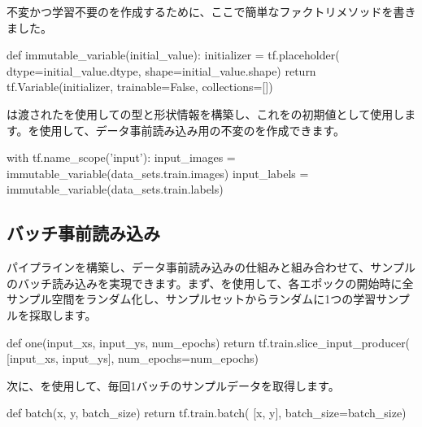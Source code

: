 \begin{content}
不変かつ学習不要のを作成するために、ここで簡単なファクトリメソッドを書きました。


\begin{leftbar}
\begin{python}
def immutable_variable(initial_value):
  initializer = tf.placeholder(
    dtype=initial_value.dtype,
    shape=initial_value.shape)
  return tf.Variable(initializer, trainable=False, collections=[])
\end{python}
\end{leftbar}

は渡されたを使用しての型と形状情報を構築し、これをの初期値として使用します。を使用して、データ事前読み込み用の不変のを作成できます。


\begin{leftbar}
\begin{python}
with tf.name_scope('input'):
  input_images = immutable_variable(data_sets.train.images)
  input_labels = immutable_variable(data_sets.train.labels)
\end{python}
\end{leftbar}

\subsection{バッチ事前読み込み}

パイプラインを構築し、データ事前読み込みの仕組みと組み合わせて、サンプルのバッチ読み込みを実現できます。まず、を使用して、各エポックの開始時に全サンプル空間をランダム化し、サンプルセットからランダムに1つの学習サンプルを採取します。


\begin{leftbar}
\begin{python}
def one(input_xs, input_ys, num_epochs)
  return tf.train.slice_input_producer(
    [input_xs, input_ys], num_epochs=num_epochs)
\end{python}
\end{leftbar}

次に、を使用して、毎回1バッチのサンプルデータを取得します。

  
\begin{leftbar}
\begin{python}
def batch(x, y, batch_size)
  return tf.train.batch(
    [x, y], batch_size=batch_size)
\end{python}
\end{leftbar}


\end{content}
